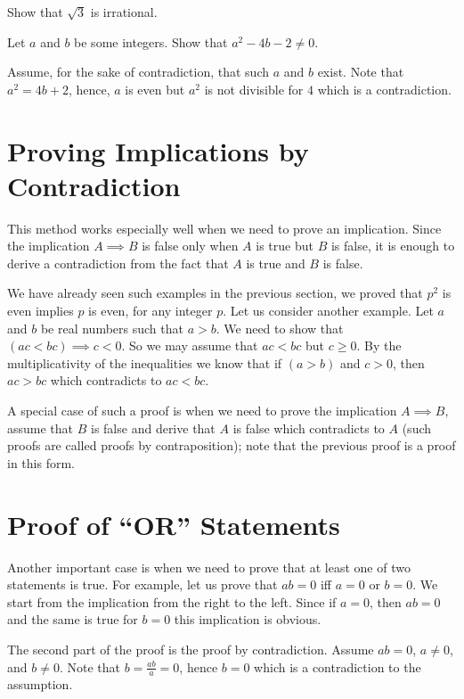\begin{exercise}
  Show that $\sqrt{3}$ is irrational.
\end{exercise}

\begin{exercise}
  Let $a$ and $b$ be some integers. Show that $a^2 - 4b - 2 \neq 0$.
\end{exercise}
\begin{solution}
  Assume, for the sake of contradiction, that such $a$ and $b$ exist. Note that
  $a^2 = 4b + 2$, hence, $a$ is even but $a^2$ is not divisible for $4$ which is a
  contradiction.
\end{solution}

\section{Proving Implications by Contradiction}
This method works especially well when we need to prove an implication.
Since the implication $A \implies B$ is false only when $A$ is true but $B$ is
false, it is enough to derive a contradiction from the fact that $A$ is true
and $B$ is false.

We have already seen such examples in the previous section, we proved that
$p^2$ is even implies $p$ is even, for any integer $p$. Let us consider another
example. Let $a$ and $b$ be real numbers such that $a > b$. We need to show that
$(ac < bc) \implies c < 0$. So we may assume that $ac < bc$ but $c \ge 0$. By
the multiplicativity of the inequalities we know that if $(a > b)$ and $c > 0$,
then $ac > bc$ which contradicts to $ac < bc$.

A special case of such a proof is when we need to prove the implication
$A \implies B$, assume that $B$ is false and derive that $A$ is false which
contradicts to  $A$ (such proofs are called proofs by contraposition); note
that the previous proof is a proof in this form.

\section{Proof of ``OR'' Statements}
Another important case is when we need to prove that at least one of two
statements is true. For example, let us prove that $ab = 0$ iff $a = 0$ or
$b = 0$. We start from the implication from the right to the left. Since if
$a = 0$, then $ab = 0$ and the same is true for $b = 0$ this implication is
obvious.

The second part of the proof is the proof by contradiction. Assume $ab = 0$,
$a \neq 0$, and $b \neq 0$. Note that $b = \frac{ab}{a} = 0$,
hence $b = 0$ which is a contradiction to the assumption.


